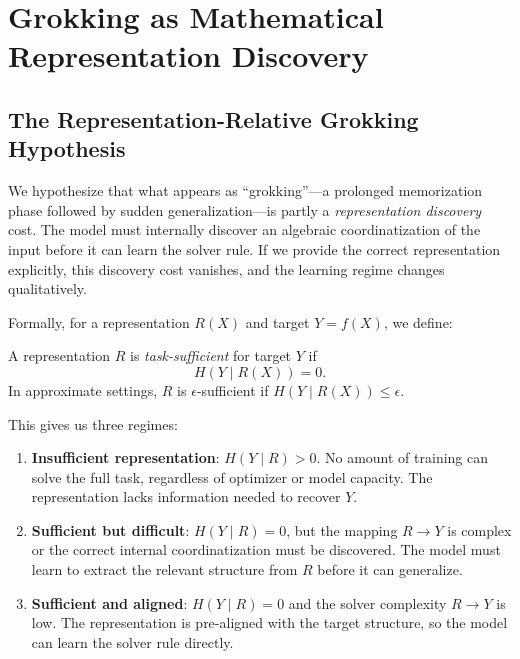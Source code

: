 
\section{Grokking as Mathematical Representation Discovery}
\label{sec:repr_grokking}

\subsection{The Representation-Relative Grokking Hypothesis}

We hypothesize that what appears as ``grokking''---a prolonged memorization phase followed by sudden generalization---is partly a \emph{representation discovery} cost. The model must internally discover an algebraic coordinatization of the input before it can learn the solver rule. If we provide the correct representation explicitly, this discovery cost vanishes, and the learning regime changes qualitatively.

Formally, for a representation $R(X)$ and target $Y = f(X)$, we define:

\begin{definition}
A representation $R$ is \emph{task-sufficient} for target $Y$ if
\[
    H(Y \mid R(X)) = 0.
\]
In approximate settings, $R$ is $\epsilon$-sufficient if $H(Y \mid R(X)) \leq \epsilon$.
\end{definition}

This gives us three regimes:

\begin{enumerate}[leftmargin=*]
    \item \textbf{Insufficient representation}: $H(Y \mid R) > 0$. No amount of training can solve the full task, regardless of optimizer or model capacity. The representation lacks information needed to recover $Y$.

    \item \textbf{Sufficient but difficult}: $H(Y \mid R) = 0$, but the mapping $R \to Y$ is complex or the correct internal coordinatization must be discovered. The model must learn to extract the relevant structure from $R$ before it can generalize.

    \item \textbf{Sufficient and aligned}: $H(Y \mid R) = 0$ and the solver complexity $R \to Y$ is low. The representation is pre-aligned with the target structure, so the model can learn the solver rule directly.
\end{enumerate}

